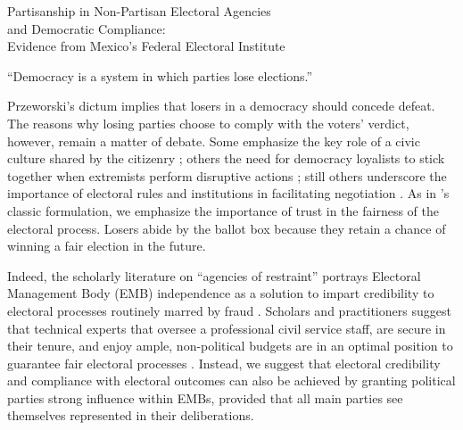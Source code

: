 \documentclass[12 pt, letter]{article}
\begin{document}
\begin{center}
\Large{Partisanship in Non-Partisan Electoral Agencies\\ and Democratic Compliance:\\ Evidence from Mexico's Federal Electoral Institute}
\end{center}
\bigskip

\begin{flushright}
``Democracy is a system in which parties lose elections.'' \\ \citet[p. 10]{Przeworski1991}
\end{flushright}

\doublespace \noindent Przeworski's dictum implies that losers in a
democracy should concede defeat. The reasons why losing parties
choose to comply with the voters' verdict, however, remain a matter
of debate. Some emphasize the key role of a civic culture shared by
the citizenry \citep[e.g.,][]{Putnam2000}; others the need for
democracy loyalists to stick together when extremists perform
disruptive actions \citep[e.g.,][]{Linz1978}; still others
underscore the importance of electoral rules and institutions in
facilitating negotiation \citep[e.g.,][]{Jones1995}. As in
\citeauthor{Przeworski1991}'s classic formulation, we emphasize the
importance of trust in the fairness of the electoral process. Losers
abide by the ballot box because they retain a chance of winning a
fair election in the future.

Indeed, the scholarly literature on ``agencies of restraint''
portrays Electoral Management Body (EMB) independence as a solution
to impart credibility to electoral processes routinely marred by
fraud \citep{Schedler1999, Hartlyn2006}.  Scholars and practitioners
suggest that technical experts that oversee a professional civil
service staff, are secure in their tenure, and enjoy ample,
non-political budgets are in an optimal position to guarantee fair
electoral processes \citep[see references in][]{LopezPintor2000,
Mozaffar2002}. Instead, we suggest that electoral credibility and
compliance with electoral outcomes can also be achieved by granting
political parties strong influence within EMBs, provided that all
main parties see themselves represented in their deliberations.
\end{document}
